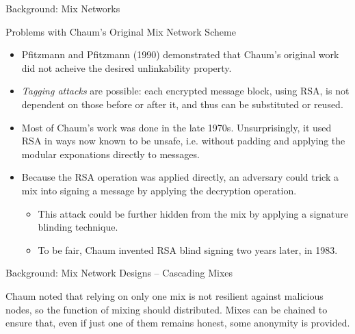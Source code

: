 \documentclass[9pt,a4paper]{beamer}
\begin{document}
\begin{frame}{Background: Mix Networks}
  \begin{block}{Problems with Chaum's Original Mix Network Scheme}
    \begin{itemize}
      \item Pfitzmann and Pfitzmann (1990) demonstrated that Chaum's original
        work did not acheive the desired unlinkability property.
      \item<2-> \emph{Tagging attacks} are possible: each encrypted message block,
        using RSA, is not dependent on those before or after it, and thus can be
        substituted or reused.
      \item<3-> Most of Chaum's work was done in the late 1970s.
        Unsurprisingly, it used RSA in ways now known to be unsafe, i.e. without
        padding and applying the modular exponations directly to messages.
      \item<4-> Because the RSA operation was applied directly, an adversary
        could trick a mix into signing a message by applying the decryption
        operation.
        \begin{itemize}
          \item<5-> This attack could be further hidden from the mix by applying
            a signature blinding technique.
          \item<6-> To be fair, Chaum invented RSA blind signing two years later, in
            1983.
        \end{itemize}
    \end{itemize}
  \end{block}
\end{frame}


\begin{frame}{Background: Mix Network Designs -- Cascading Mixes}

  Chaum noted that relying on only one mix is not resilient against malicious
  nodes, so the function of mixing should distributed.  Mixes can be chained to
  ensure that, even if just one of them remains honest, some anonymity is
  provided.

\end{frame}
\end{document}

